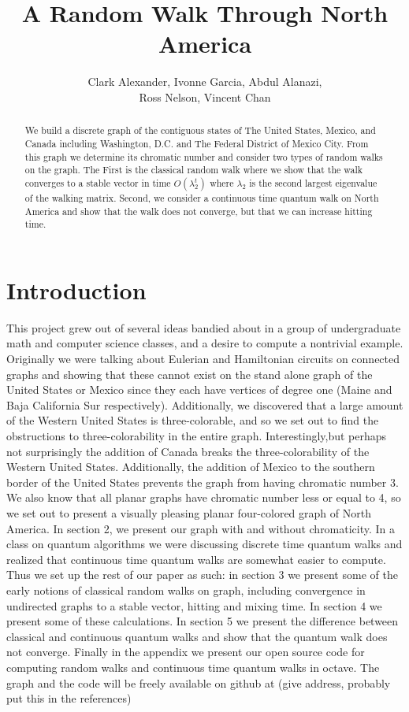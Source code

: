 \documentclass{article}
\title{A Random Walk Through North America}
\author{Clark Alexander, Ivonne Garcia, Abdul Alanazi,\\
Ross Nelson, Vincent Chan}
\theoremstyle{definition}
\theoremstyle{remark}
\numberwithin{equation}{section}
\begin{document}
\maketitle

\begin{abstract}
We build a discrete graph of the contiguous states of The United States, Mexico, and Canada including Washington, D.C. and The Federal District of Mexico City.  From this graph we determine its chromatic number and consider two types of random walks on the graph.  The First is the classical random walk where we show that the walk converges to a stable vector in time $O(\lambda_2^t)$ where $\lambda_2$ is the second largest eigenvalue of the walking matrix.  Second, we consider a continuous time quantum walk on North America and show that the walk does not converge, but that we can increase hitting time.
\end{abstract}


\section{Introduction}

This project grew out of several ideas bandied about in a group of undergraduate math and computer science classes, and a desire to compute a nontrivial example.  Originally we were talking about Eulerian and Hamiltonian circuits on connected graphs and showing that these cannot exist on the stand alone graph of the United States or Mexico since they each have vertices of degree one (Maine and Baja California Sur respectively).  Additionally, we discovered that a large amount of the Western United States is three-colorable, and so we set out to find the obstructions to three-colorability in the entire graph.  Interestingly,but perhaps not surprisingly the addition of Canada breaks the three-colorability of the Western United States.  Additionally, the addition of Mexico to the southern border of the United States prevents the graph from having chromatic number 3.  We also know that all planar graphs have chromatic number less or equal to 4, so we set out to present a visually pleasing planar four-colored graph of North America.  In section 2, we present our graph with and without chromaticity.  In a class on quantum algorithms we were discussing discrete time quantum walks and realized that continuous time quantum walks are somewhat easier to compute.  Thus we set up the rest of our paper as such: in section 3 we present some of the early notions of classical random walks on graph, including convergence in undirected graphs to a stable vector, hitting and mixing time. In section 4 we present some of these calculations.  In section 5 we present the difference between classical and continuous quantum walks and show that the quantum walk does not converge.  Finally in the appendix we present our open source code for computing random walks and continuous time quantum walks in octave.  The graph and the code will be freely available on github at (give address, probably put this in the references) 
\end{document}
